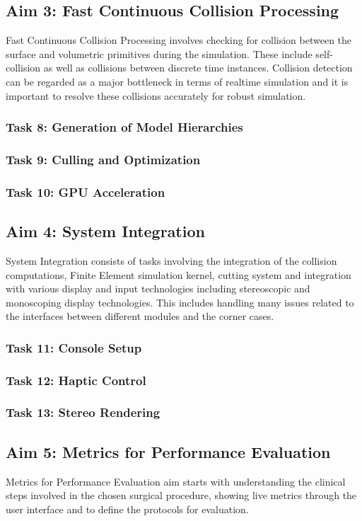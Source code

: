\subsection{Aim 3: Fast Continuous Collision Processing}
Fast Continuous Collision Processing involves checking for collision between the surface and volumetric primitives during the simulation. These include self-collision as well as collisions between discrete time instances. Collision detection can be regarded as a major bottleneck in terms of realtime simulation and it is important to resolve these collisions accurately for robust simulation.

\subsubsection{Task 8: Generation of Model Hierarchies}
\subsubsection{Task 9: Culling and Optimization}
\subsubsection{Task 10: GPU Acceleration}

\subsection{Aim 4: System Integration}
System Integration consists of tasks involving the integration of the collision computations, Finite Element simulation kernel, cutting system and integration with various display and input technologies including stereoscopic and monoscoping display technologies. This includes handling many issues related to the interfaces between different modules and the corner cases.

\subsubsection{Task 11: Console Setup}
\subsubsection{Task 12: Haptic Control}
\subsubsection{Task 13: Stereo Rendering}

\subsection{Aim 5: Metrics for Performance Evaluation}
Metrics for Performance Evaluation aim starts with understanding the clinical steps involved in the chosen surgical procedure, showing live metrics through the user interface and to define the protocols for evaluation.

